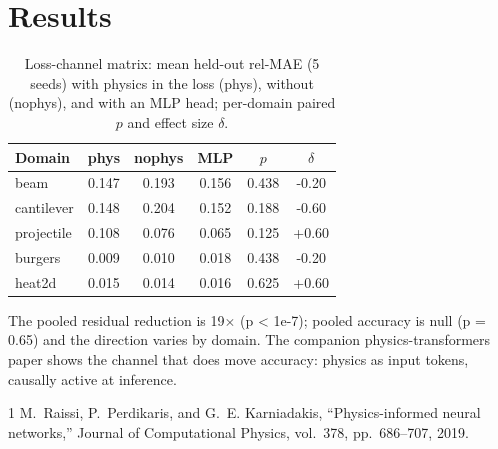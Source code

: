 \documentclass[conference,10pt]{IEEEtran}
\begin{document}
\section{Results}
\begin{table}[!t]
\caption{Loss-channel matrix: mean held-out rel-MAE (5 seeds) with physics
in the loss (phys), without (nophys), and with an MLP head; per-domain
paired $p$ and effect size $\delta$.}
\label{tab:loss}
\centering
\begin{tabular}{lccccc}
\toprule
Domain & phys & nophys & MLP & $p$ & $\delta$ \\
\midrule
beam & 0.147 & 0.193 & 0.156 & 0.438 & -0.20 \\
cantilever & 0.148 & 0.204 & 0.152 & 0.188 & -0.60 \\
projectile & 0.108 & 0.076 & 0.065 & 0.125 & +0.60 \\
burgers & 0.009 & 0.010 & 0.018 & 0.438 & -0.20 \\
heat2d & 0.015 & 0.014 & 0.016 & 0.625 & +0.60 \\
\bottomrule
\end{tabular}
\end{table}

The pooled residual reduction is 19$\times$ (p < 1e-7); pooled accuracy is null (p = 0.65) and the direction varies by domain. The companion physics-transformers paper shows the channel that does move accuracy: physics as input tokens, causally active at inference.

\begin{thebibliography}{1}
 M.~Raissi, P.~Perdikaris, and G.~E. Karniadakis, ``Physics-informed neural networks,'' Journal of Computational Physics, vol.~378, pp.~686--707, 2019.
\end{thebibliography}
\end{document}
